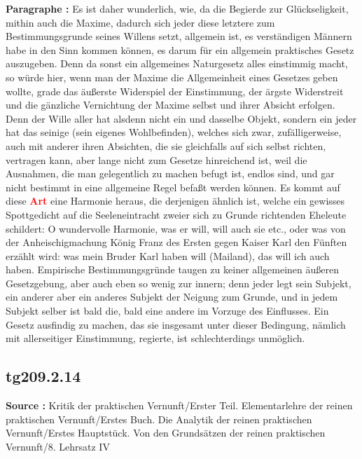 \documentclass[a4paper,12pt,twoside]{book}
\newcommand{\match}[1]{\textcolor{red}{\textbf{#1}}}
\begin{document}
	\noindent\textbf{Paragraphe : }
	Es ist daher wunderlich, wie, da die Begierde zur Glückseligkeit, mithin auch die Maxime, dadurch sich jeder diese letztere zum Bestimmungsgrunde seines Willens setzt, allgemein ist, es verständigen Männern habe in den Sinn kommen können, es darum für ein allgemein praktisches Gesetz auszugeben. Denn da sonst ein allgemeines Naturgesetz alles einstimmig macht, so würde hier, wenn man der Maxime die Allgemeinheit eines Gesetzes geben wollte, grade das äußerste Widerspiel der Einstimmung, der ärgste Widerstreit und die gänzliche Vernichtung der Maxime selbst und ihrer Absicht erfolgen. Denn der Wille aller hat alsdenn nicht ein und dasselbe Objekt, sondern ein jeder hat das seinige (sein eigenes Wohlbefinden), welches sich zwar, zufälligerweise, auch mit anderer ihren Absichten, die sie gleichfalls auf sich selbst richten, vertragen kann, aber lange nicht zum Gesetze hinreichend ist, weil die Ausnahmen, die man gelegentlich zu machen befugt ist, endlos sind, und gar nicht bestimmt in eine allgemeine Regel befaßt werden können. Es kommt auf diese \match{Art} eine Harmonie heraus, die derjenigen ähnlich ist, welche ein gewisses Spottgedicht auf die Seeleneintracht zweier sich zu Grunde richtenden Eheleute schildert: O wundervolle Harmonie, was er will, will auch sie etc., oder was von der Anheischigmachung König Franz des Ersten gegen Kaiser Karl den Fünften erzählt wird: was mein Bruder Karl haben will (Mailand), das will ich auch haben. Empirische Bestimmungsgründe taugen zu keiner allgemeinen äußeren Gesetzgebung, aber auch eben so wenig zur innern; denn jeder legt sein Subjekt, ein anderer aber ein anderes Subjekt der Neigung zum Grunde, und in jedem Subjekt selber ist bald die, bald eine andere im Vorzuge des Einflusses. Ein Gesetz ausfindig zu machen, das sie insgesamt unter dieser Bedingung, nämlich mit allerseitiger Einstimmung, regierte, ist schlechterdings unmöglich. 
	
	\subsection*{tg209.2.14} 
	\textbf{Source : }Kritik der praktischen Vernunft/Erster Teil. Elementarlehre der reinen praktischen Vernunft/Erstes Buch. Die Analytik der reinen praktischen Vernunft/Erstes Hauptstück. Von den Grundsätzen der reinen praktischen Vernunft/8. Lehrsatz IV\\  
	
\end{document}
